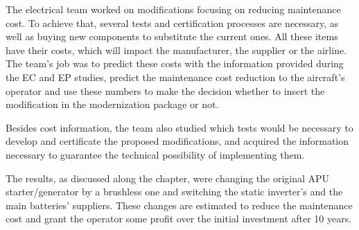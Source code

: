 The electrical team worked on modifications focusing on reducing maintenance cost. To achieve that, several tests and certification processes are necessary, as well as buying new components to substitute the current ones. All these items have their costs, which will impact the manufacturer, the supplier or the airline. The team's job was to predict these costs with the information provided during the EC and EP studies, predict the maintenance cost reduction to the aircraft's operator and use these numbers to make the decision whether to insert the modification in the modernization package or not.

Besides cost information, the team also studied which tests would be necessary to develop and certificate the proposed modifications, and acquired the information necessary to guarantee the technical possibility of implementing them.

The results, as discussed along the chapter, were changing the original APU starter/generator by a brushless one and switching the static inverter's and the main batteries' suppliers. These changes are estimated to reduce the maintenance cost and grant the operator some profit over the initial investment after 10 years.
